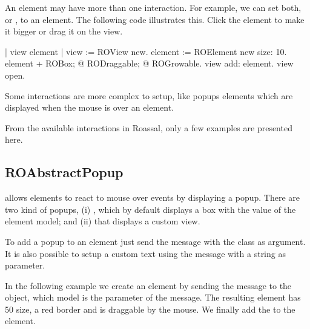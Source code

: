 \documentclass[a4paper,10pt,twoside]{book}
\begin{document}
An element may have more than one interaction. For example, we can set both,   or , to an element.
The following code illustrates this. Click the element to make it bigger or drag it on the view.

\begin{code}{}
| view element |
view := ROView new.
element := ROElement new size: 10.
element 
	+ ROBox;
	@ RODraggable; 
	@ ROGrowable.
view add: element.
view open.
\end{code}


Some interactions are more complex to setup, like popups elements which are displayed when the mouse is over an element. 

From the available interactions in Roassal, only a few examples are presented here.

\subsection*{ROAbstractPopup}

 allows elements to react to mouse over events by displaying a popup. There are two kind of popups, (i) , which by default displays a box with the  value of the element model; and (ii)  that displays a custom view.

To add a popup to an element just send the  message with the  class as argument. It is also possible to setup a custom text using the  message with a string as parameter. 

In the following example we create an element by sending the  message to the  object, which model is the parameter of the message. The resulting element has 50 size, a red border and is draggable by the mouse. We finally add the  to the element.
\end{document}
